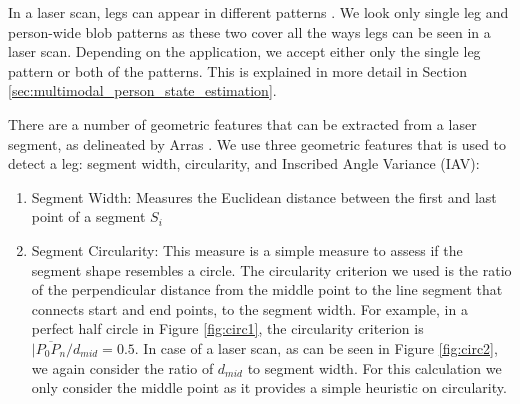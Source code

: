 In a laser scan, legs can appear in different patterns \cite{topp2005tracking}. We look only single leg and person-wide blob patterns as these two cover all the ways legs can be seen in a laser scan. Depending on the application, we accept either only the single leg pattern or both of the patterns. This is explained in more detail in Section \ref{sec:multimodal_person_state_estimation}.

There are a number of geometric features that can be extracted from a laser segment, as delineated by Arras \cite{arras2007using}. We use three geometric features that is used to detect a leg: segment width, circularity, and Inscribed Angle Variance (IAV):


\begin{enumerate}
\item Segment Width: Measures the Euclidean distance between the first and last point of a segment $S_i$




\item Segment Circularity: This measure is a simple measure to assess if the segment shape resembles a circle. The circularity criterion we used is the ratio of the perpendicular distance from the middle point to the line segment that connects start and end points, to the segment width. For example, in a perfect half circle in Figure \ref{fig:circ1}, the circularity criterion is $|\overline{P_0P_n}/d_{mid}=0.5$. In case of a laser scan, as can be seen in Figure \ref{fig:circ2}, we again consider the ratio of $d_{mid}$ to segment width. For this calculation we only consider the middle point as it provides a simple heuristic on circularity.


\end{enumerate}
